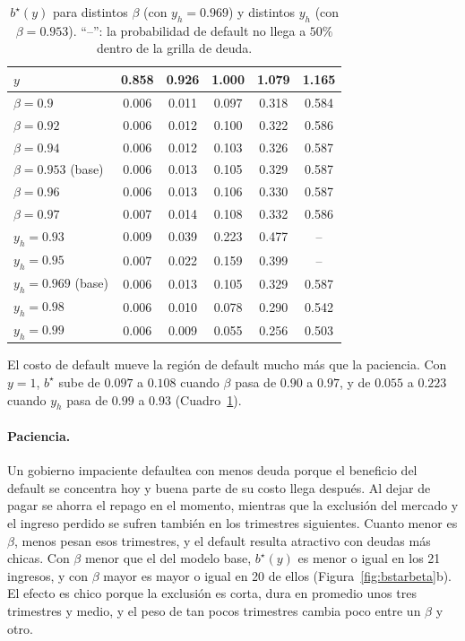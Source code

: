 \documentclass[11pt,a4paper]{article}
\begin{document}
\begin{table}[htpb]
\centering
\begin{tabular}{lccccc}
\toprule
$y$ & 0.858 & 0.926 & 1.000 & 1.079 & 1.165\\
\midrule
$\beta=0.9$ & 0.006 & 0.011 & 0.097 & 0.318 & 0.584\\
$\beta=0.92$ & 0.006 & 0.012 & 0.100 & 0.322 & 0.586\\
$\beta=0.94$ & 0.006 & 0.012 & 0.103 & 0.326 & 0.587\\
$\beta=0.953$ (base) & 0.006 & 0.013 & 0.105 & 0.329 & 0.587\\
$\beta=0.96$ & 0.006 & 0.013 & 0.106 & 0.330 & 0.587\\
$\beta=0.97$ & 0.007 & 0.014 & 0.108 & 0.332 & 0.586\\
\midrule
$y_h=0.93$ & 0.009 & 0.039 & 0.223 & 0.477 & --\\
$y_h=0.95$ & 0.007 & 0.022 & 0.159 & 0.399 & --\\
$y_h=0.969$ (base) & 0.006 & 0.013 & 0.105 & 0.329 & 0.587\\
$y_h=0.98$ & 0.006 & 0.010 & 0.078 & 0.290 & 0.542\\
$y_h=0.99$ & 0.006 & 0.009 & 0.055 & 0.256 & 0.503\\
\bottomrule
\end{tabular}
\caption{$b^\star(y)$ para distintos $\beta$ (con $y_h=0.969$) y distintos $y_h$ (con $\beta=0.953$). ``--'': la probabilidad de default no llega a $50\%$ dentro de la grilla de deuda.}
\label{tab:bstaropc}
\end{table}

El costo de default mueve la región de default mucho más que la paciencia. Con $y=1$, $b^\star$ sube de $0.097$ a $0.108$ cuando $\beta$ pasa de $0.90$ a $0.97$, y de $0.055$ a $0.223$ cuando $y_h$ pasa de $0.99$ a $0.93$ (Cuadro~\ref{tab:bstaropc}).

\paragraph{Paciencia.} Un gobierno impaciente defaultea con menos deuda porque el beneficio del default se concentra hoy y buena parte de su costo llega después. Al dejar de pagar se ahorra el repago en el momento, mientras que la exclusión del mercado y el ingreso perdido se sufren también en los trimestres siguientes. Cuanto menor es $\beta$, menos pesan esos trimestres, y el default resulta atractivo con deudas más chicas. Con $\beta$ menor que el del modelo base, $b^\star(y)$ es menor o igual en los 21 ingresos, y con $\beta$ mayor es mayor o igual en 20 de ellos (Figura~\ref{fig:bstarbeta}b). El efecto es chico porque la exclusión es corta, dura en promedio unos tres trimestres y medio, y el peso de tan pocos trimestres cambia poco entre un $\beta$ y otro.
\end{document}
